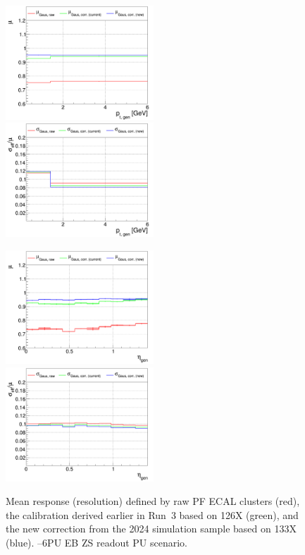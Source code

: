 \begin{figure}
\includegraphics[width=0.495\textwidth]{./plots_pdf/ECAL_plots/plotsPU/EB/ZS/pdf/GENPT/EBZS_GENPT_0000_0006_MuOverBins.pdf}
\includegraphics[width=0.495\textwidth]{./plots_pdf/ECAL_plots/plotsPU/EB/ZS/pdf/GENPT/EBZS_GENPT_0000_0006_EffSigmaOverBins.pdf}

\includegraphics[width=0.495\textwidth]{./plots_pdf/ECAL_plots/plotsPU/EB/ZS/pdf/GENETA/EBZS_GENETA_0000_0006_MuOverBins.pdf}
\includegraphics[width=0.495\textwidth]{./plots_pdf/ECAL_plots/plotsPU/EB/ZS/pdf/GENETA/EBZS_GENETA_0000_0006_EffSigmaOverBins.pdf}
\caption[$\mu$ ($\sigma_\mathrm{eff}$) vs. \pt of PF ECAL cluster - EB ZS readout PU scenario]{Mean response (resolution) defined by raw PF ECAL clusters (red), the calibration derived earlier in Run~3 based on 126X (green), and the new correction from the 2024 simulation sample based on 133X (blue). --6\GeV PU EB ZS readout PU scenario.}
\label{fig:PU_EBZS}
\end{figure}

